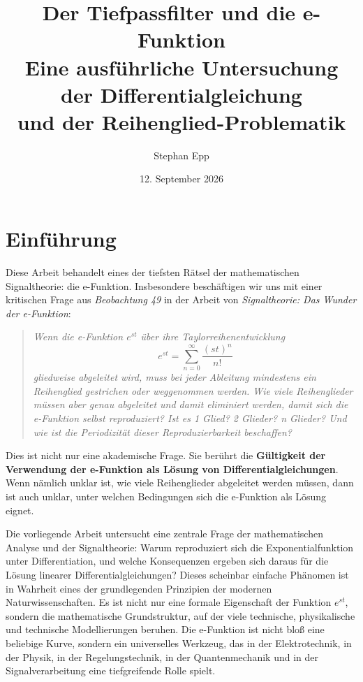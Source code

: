 \documentclass[a4paper,12pt,twoside]{report}
\title{\textbf{Der Tiefpassfilter und die e-Funktion} \\ 
{\Large Eine ausführliche Untersuchung der Differentialgleichung \\ und der Reihenglied-Problematik}}
\author{Stephan Epp}
\date{12. September 2026}
\theoremstyle{definition}
\begin{document}
	
\maketitle

\tableofcontents

\newpage

\section{Einführung}
Diese Arbeit behandelt eines der tiefsten Rätsel der mathematischen Signaltheorie: die e-Funktion. Insbesondere beschäftigen wir uns mit einer kritischen Frage aus \textit{Beobachtung 49} in der Arbeit von \cite{epp_signal} \textit{Signaltheorie: Das Wunder der e-Funktion}:

\begin{quote}
	\textit{Wenn die e-Funktion $e^{st}$ über ihre Taylorreihenentwicklung 
	$$e^{st} = \sum_{n=0}^{\infty} \frac{(st)^n}{n!}$$
	gliedweise abgeleitet wird, muss bei jeder Ableitung mindestens ein Reihenglied gestrichen oder weggenommen werden. Wie viele Reihenglieder müssen aber genau abgeleitet und damit eliminiert werden, damit sich die e-Funktion selbst reproduziert? Ist es 1 Glied? 2 Glieder? n Glieder? Und wie ist die Periodizität dieser Reproduzierbarkeit beschaffen?}
\end{quote}

Dies ist nicht nur eine akademische Frage. Sie berührt die \textbf{Gültigkeit der Verwendung der e-Funktion als Lösung von Differentialgleichungen}. Wenn nämlich unklar ist, wie viele Reihenglieder abgeleitet werden müssen, dann ist auch unklar, unter welchen Bedingungen sich die e-Funktion als Lösung eignet.

Die vorliegende Arbeit untersucht eine zentrale Frage der mathematischen Analyse und der Signaltheorie: Warum reproduziert sich die Exponentialfunktion unter Differentiation, und welche Konsequenzen ergeben sich daraus für die Lösung linearer Differentialgleichungen? Dieses scheinbar einfache Phänomen ist in Wahrheit eines der grundlegenden Prinzipien der modernen Naturwissenschaften. Es ist nicht nur eine formale Eigenschaft der Funktion $e^{st}$, sondern die mathematische Grundstruktur, auf der viele technische, physikalische und technische Modellierungen beruhen. Die e-Funktion ist nicht bloß eine beliebige Kurve, sondern ein universelles Werkzeug, das in der Elektrotechnik, in der Physik, in der Regelungstechnik, in der Quantenmechanik und in der Signalverarbeitung eine tiefgreifende Rolle spielt.
\end{document}
